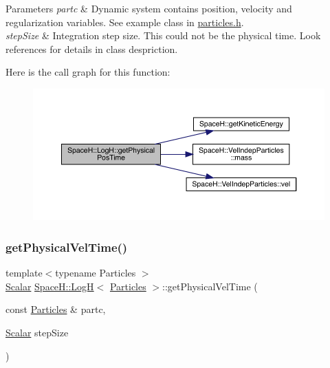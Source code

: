 \begin{DoxyParams}{Parameters}
{\em partc} & Dynamic system contains position, velocity and regularization variables. See example class in \mbox{\hyperlink{particles_8h}{particles.\+h}}. \\
\hline
{\em step\+Size} & Integration step size. This could not be the physical time. Look references for details in class despriction. \\
\hline
\end{DoxyParams}
Here is the call graph for this function\+:
\nopagebreak
\begin{figure}[H]
\begin{center}
\leavevmode
\includegraphics[width=350pt]{class_space_h_1_1_log_h_a57e53ea3152d08ebb3153bd42a71e3a8_cgraph}
\end{center}
\end{figure}
\mbox{\label{class_space_h_1_1_log_h_a04cad522588d52045507735376308301}} 
\subsubsection{\texorpdfstring{get\+Physical\+Vel\+Time()}{getPhysicalVelTime()}}
{\footnotesize\ttfamily template$<$typename Particles $>$ \\
\mbox{\hyperlink{class_space_h_1_1_log_h_a930675187172d40c888b4b2c94f0bff5}{Scalar}} \mbox{\hyperlink{class_space_h_1_1_log_h}{Space\+H\+::\+LogH}}$<$ \mbox{\hyperlink{struct_space_h_1_1_particles}{Particles}} $>$\+::get\+Physical\+Vel\+Time (\begin{DoxyParamCaption}\item[{const \mbox{\hyperlink{struct_space_h_1_1_particles}{Particles}} \&}]{partc,  }\item[{\mbox{\hyperlink{class_space_h_1_1_log_h_a930675187172d40c888b4b2c94f0bff5}{Scalar}}}]{step\+Size }\end{DoxyParamCaption})\hspace{0.3cm}{\ttfamily [inline]}}




